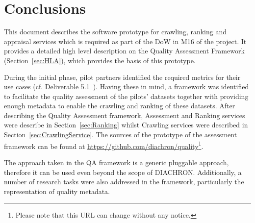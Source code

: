 
\section{Conclusions}
\label{sec:Conclusion} 

This document describes the software prototype for crawling, ranking and appraisal services which is required as part of the DoW in M16 of the project.
It provides a detailed high level description on the Quality Assessment Framework (Section~\ref{sec:HLA}), which provides the basis of this prototype.

During the initial phase, pilot partners identified the required metrics for their use cases (cf. Deliverable 5.1~\cite{diachron-d5.1}).
Having these in mind, a framework was identified to facilitate the quality assessment of the pilots' datasets together with providing enough metadata to enable the crawling and ranking of these datasets.
After describing the Quality Assessment framework, Assessment and Ranking services were describe in Section~\ref{sec:Ranking} whilst Crawling services were described in Section~\ref{sec:CrawlingService}.
The sources of the prototype of the assessment framework can be found at \url{https://github.com/diachron/quality}\footnote{Please note that this URL can change without any notice.}.

The approach taken in the QA framework is a generic pluggable approach, therefore it can be used even beyond the scope of DIACHRON.
Additionally, a number of research tasks were also addressed in the framework, particularly the representation of quality metadata.